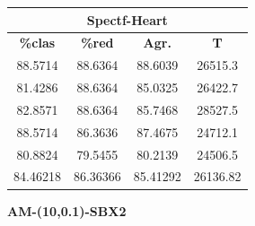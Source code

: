 \documentclass[11pt,a4paper]{article}
\theoremstyle{definition}
\begin{document}
\begin{tabbing}
{		\begin{tabular}{|c|c|c|c|}
			\hline
			\multicolumn{4}{|c|}{\textbf{Spectf-Heart}} \\ \hline
			\textbf{\%clas} & \textbf{\%red} & \textbf{Agr.} & \textbf{T} \\ \hline 
			88.5714 & 88.6364 & 88.6039 & 26515.3 \\ \hline
81.4286 & 88.6364 & 85.0325 & 26422.7 \\ \hline
82.8571 & 88.6364 & 85.7468 & 28527.5 \\ \hline
88.5714 & 86.3636 & 87.4675 & 24712.1 \\ \hline
80.8824 & 79.5455 & 80.2139 & 24506.5 \\ \hline
84.46218 & 86.36366 & 85.41292 & 26136.82 \\ \hline
		\end{tabular}
		}
	\end{tabbing}
	
	\textbf{AM-(10,0.1)-SBX2}	
	
\end{document}
